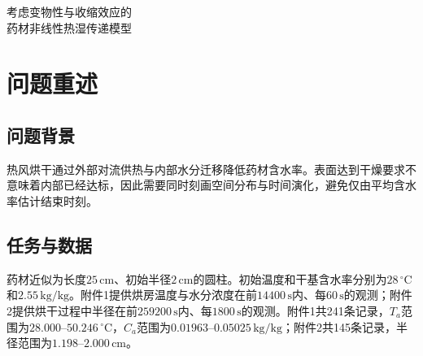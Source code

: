 \documentclass[UTF8,zihao=-4,a4paper]{ctexart}
\newcommand{\keywords}[1]{\par\noindent\textbf{关键词：}#1}
\begin{document}
\pagestyle{plain}\songti{}
\begin{center}\titlefont{}考虑变物性与收缩效应的\\药材非线性热湿传递模型\end{center}

\begin{abstract}
药材热风干燥存在表面失水快、内部响应滞后及后期传质受限等现象，仅用平均含水率难以判断全域是否达标。针对圆柱形药材，本文以温度和干基含水率为状态，建立变物性径向热湿传递模型，并在收缩条件下采用归一化材料坐标统一描述计算域。

针对问题1，使用题给预热物性及环境观测构造对流边界，采用圆环有限体积法求解温湿分布。1800秒时中心与表面温度分别为33.5753和36.7856摄氏度，表面含水率降至1.5103千克/千克，中心仍接近初值，体现出明显的径向传递滞后。

针对问题2和问题3，将附录3经验物性纳入全程模型，以浓度区间积分计算非线性界面扩散系数，并通过表面加密网格和隐式迭代解析低含水率层。以全域最大含水率低于0.15千克/千克为判据，得到固定半径条件下的报告干燥时长为57.1696小时；同时给出前3小时代表性剖面以及全过程逐秒结果。

针对问题4，引入实测半径变化和附录4物性，得到报告干燥时长50.8244小时、终点半径1.2000厘米。采用当前物理半径重构固定距离结果，避免将域外空值误作零含水率。两问同时改变物性与几何，时长差不能全部归因于收缩。

通过容差收紧、独立离散程序对照及边界系数情景扫描检验实现。时间容差收紧后，两问报告终点差不超过0.0146秒；在给定离散情景内，传质系数扰动对时长的影响大于换热系数扰动。上述检验不替代物理标定：4小时后的环境延拓、有效气固浓度映射及潜热省略仍限制预测精度。模型可用于给定工况下的温湿分布分析与条件性干燥时间估算。

\keywords{圆柱径向扩散；变物性；区间积分通量；移动坐标；有限体积；全域达标}
\end{abstract}
\clearpage

\section{问题重述}
\subsection{问题背景}
热风烘干通过外部对流供热与内部水分迁移降低药材含水率。表面达到干燥要求不意味着内部已经达标，因此需要同时刻画空间分布与时间演化，避免仅由平均含水率估计结束时刻。
\subsection{任务与数据}
药材近似为长度$25\,\mathrm{cm}$、初始半径$2\,\mathrm{cm}$的圆柱。初始温度和干基含水率分别为$28\,^{\circ}\mathrm C$和$2.55\,\mathrm{kg/kg}$。附件1提供烘房温度与水分浓度在前$14400\,\mathrm s$内、每$60\,\mathrm s$的观测；附件2提供烘干过程中半径在前$259200\,\mathrm s$内、每$1800\,\mathrm s$的观测。附件1共241条记录，$T_a$范围为$28.000$--$50.246\,^{\circ}\mathrm C$，$C_a$范围为$0.01963$--$0.05025\,\mathrm{kg/kg}$；附件2共145条记录，半径范围为$1.198$--$2.000\,\mathrm{cm}$。
\end{document}
